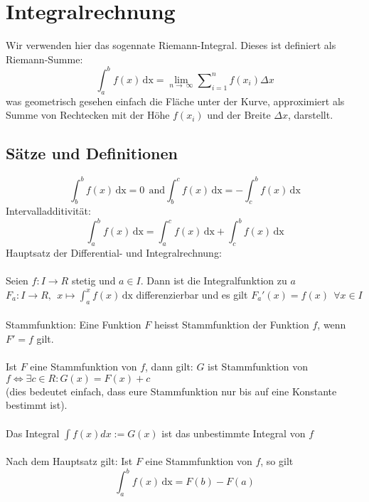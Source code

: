 \documentclass[12pt]{article}
\begin{document}
\section{Integralrechnung}
Wir verwenden hier das sogennate Riemann-Integral. Dieses ist definiert als Riemann-Summe:
\begin{equation}
\int_{a}^b f(x)\, \mathrm{dx} = \lim_{n \to \ \infty } \sum\nolimits_{i=1}^n f(x_i) \Delta x
\end{equation}
was geometrisch gesehen einfach die Fläche unter der Kurve, approximiert als Summe von Rechtecken mit der Höhe $f(x_i)$ und der Breite $\Delta x$, darstellt.
\subsection{Sätze und Definitionen}
\begin{equation}
\int_{b}^b f(x)\, \mathrm{dx} = 0 \ \ \mathrm{and} \int_{b}^c f(x)\, \mathrm{dx} = -\int_{c}^b f(x)\, \mathrm{dx}
\end{equation}
Intervalladditivität:
\begin{equation}
\int_{a}^b f(x)\, \mathrm{dx} = \int_{a}^c f(x)\, \mathrm{dx} + \int_{c}^b f(x)\, \mathrm{dx}
\end{equation}
Hauptsatz der Differential- und Integralrechnung:\\
\\ Seien $f\colon I \to R$ stetig und $a \in I$. Dann ist die Integralfunktion zu $a$ 
$F_a\colon I \to R, \ \ x \mapsto \int_{a}^x f(x)\, \mathrm{dx}$
differenzierbar und es gilt $F_a'(x) = f(x) \ \ \forall x \in I$\\
\\ Stammfunktion: Eine Funktion $F$ heisst Stammfunktion der Funktion $f$, wenn $F' = f$ gilt.\\
\\ Ist $F$ eine Stammfunktion von $f$, dann gilt: $G$ ist Stammfunktion von $f \Leftrightarrow  \exists c \in R : G(x) = F(x) +c$\\
(dies bedeutet einfach, dass eure Stammfunktion nur bis auf eine Konstante bestimmt ist).\\
\\ Das Integral $\int f(x) dx := G(x)$ ist das unbestimmte Integral von $f$\\
\\Nach dem Hauptsatz gilt: Ist $F$ eine Stammfunktion von $f$, so gilt
\begin{equation}
\int_{a}^b f(x)\, \mathrm{dx} = F(b)-F(a)
\end{equation}
\end{document}
